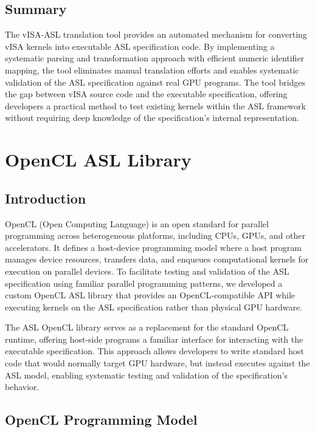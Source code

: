 \section{Summary}

The vISA-ASL translation tool provides an automated mechanism for converting
vISA kernels into executable ASL specification code. By implementing a
systematic parsing and transformation approach with efficient numeric
identifier mapping, the tool eliminates manual translation efforts and enables
systematic validation of the ASL specification against real GPU programs. The
tool bridges the gap between vISA source code and the executable specification,
offering developers a practical method to test existing kernels within the ASL
framework without requiring deep knowledge of the specification's internal
representation.



\chapter{OpenCL ASL Library}

\section{Introduction}

OpenCL (Open Computing Language) is an open standard for parallel programming
across heterogeneous platforms, including CPUs, GPUs, and other accelerators.
It defines a host-device programming model where a host program manages device
resources, transfers data, and enqueues computational kernels for execution on
parallel devices. To facilitate testing and validation of the ASL specification
using familiar parallel programming patterns, we developed a custom OpenCL ASL
library that provides an OpenCL-compatible API while executing kernels on the
ASL specification rather than physical GPU hardware.

The ASL OpenCL library serves as a replacement for the standard OpenCL runtime,
offering host-side programs a familiar interface for interacting with the
executable specification. This approach allows developers to write standard
host code that would normally target GPU hardware, but instead executes against
the ASL model, enabling systematic testing and validation of the
specification's behavior.

\section{OpenCL Programming Model}

